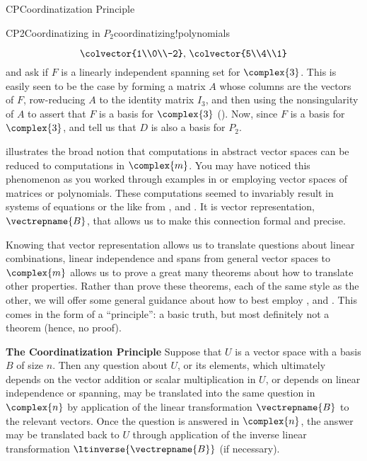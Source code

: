 \begin{subsect}{CP}{Coordinatization Principle}
\begin{example}{CP2}{Coordinatizing in $P_2$}{coordinatizing!polynomials}
\begin{para}
\begin{equation*}
{\colvector{1\\0\\-2},\,
\colvector{5\\4\\1}
}
\end{equation*}
%
and ask if $F$ is a linearly independent spanning set for $\complex{3}$.  This is easily seen to be the case by forming a matrix $A$ whose columns are the vectors of $F$, row-reducing $A$ to the identity matrix $I_3$, and then using the nonsingularity of $A$ to assert that $F$ is a basis for $\complex{3}$ ().  Now, since $F$ is a basis for $\complex{3}$,  and  tell us that $D$ is also a basis for $P_2$.\end{para}
%
\end{example}
%
\begin{para} illustrates the broad notion that computations in abstract vector spaces can be reduced to computations in $\complex{m}$.  You may have noticed this phenomenon as you worked through examples in  or  employing vector spaces of matrices or polynomials.  These computations seemed to invariably result in systems of equations or the like from ,  and .  It is vector representation, $\vectrepname{B}$, that allows us to make this connection formal and precise.\end{para}
%
\begin{para}Knowing that vector representation allows us to translate questions about linear combinations, linear independence and spans from general vector spaces to $\complex{m}$ allows us to prove a great many theorems about how to translate other properties.  Rather than prove these theorems, each of the same style as the other, we will offer some general guidance about how to best employ ,  and .  This comes in the form of a ``principle'': a basic truth, but most definitely not a theorem (hence, no proof).\end{para}
%
\begin{para}{\bf The Coordinatization Principle}\newline
Suppose that $U$ is a vector space with a basis $B$ of size $n$.   Then any question about $U$, or its elements, which ultimately depends on the vector addition or scalar multiplication in $U$, or depends on linear independence or spanning, may be translated into the same question in $\complex{n}$ by application of the linear transformation $\vectrepname{B}$ to the relevant vectors.  Once the question is answered in $\complex{n}$, the answer may be translated back to $U$ through application of the inverse linear transformation $\ltinverse{\vectrepname{B}}$ (if necessary).\end{para}

\end{subsect}
